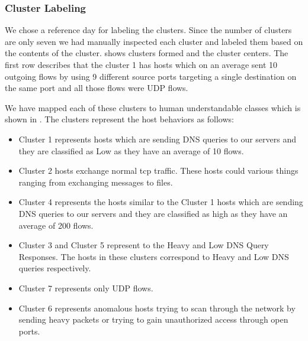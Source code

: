 \subsubsection*{Cluster Labeling}  \label{cluster_labeling}

We chose a reference day for labeling the clusters. Since the number of clusters are only seven we had manually inspected each cluster and labeled them based on the contents of the cluster.  shows clusters formed and the cluster centers. The first row describes that the cluster 1 has hosts which on an average sent 10 outgoing flows by using 9 different source ports targeting a single destination on the same port and all those flows were UDP flows. 

We have mapped each of these clusters to human understandable classes which is shown in . The clusters represent the host behaviors as follows:

\begin{itemize}
	\item Cluster 1 represents hosts which are sending DNS queries to our servers and they are classified as Low as they have an average of 10 flows. 
	
	\item Cluster 2 hosts exchange normal tcp traffic. These hosts could various things ranging from exchanging messages to files.
	
	\item Cluster 4 represents the hosts similar to the Cluster 1 hosts which are sending DNS queries to our servers and they are classified as high as they have an average of 200 flows.
	
	\item Cluster 3 and Cluster 5 represent to the Heavy and Low DNS Query Responses. The hosts in these clusters correspond to Heavy and Low DNS queries respectively.
	
	\item Cluster 7 represents only UDP flows.
	
	\item Cluster 6 represents anomalous hosts trying to scan through the network  by sending heavy packets or trying to gain unauthorized access through open ports. 
\end{itemize}

